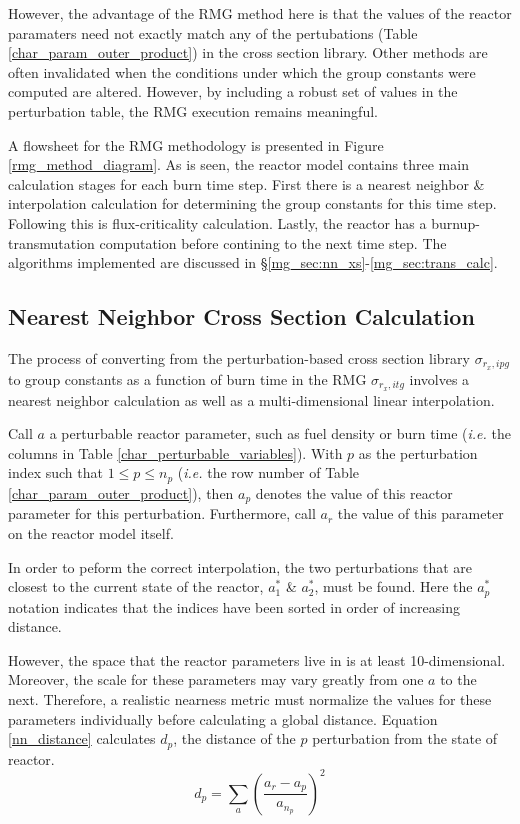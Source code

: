 However, the advantage of the RMG method here is that the values of the reactor paramaters
need not exactly match any of the pertubations (Table \ref{char_param_outer_product}) in the 
cross section library.  Other methods are often invalidated when the conditions under which 
the group constants were computed are altered.  However, by including a robust set of values
in the perturbation table, the RMG execution remains meaningful.



A flowsheet for the RMG methodology is presented in Figure \ref{rmg_method_diagram}.  As is
seen, the reactor model contains three main calculation stages for each burn time step.
First there is a nearest neighbor \& interpolation calculation for determining the group
constants for this time step.  Following this is flux-criticality calculation.  Lastly, the reactor
has a burnup-transmutation computation before contining to the next time step.  The algorithms
implemented are discussed in \S \ref{mg_sec:nn_xs}-\ref{mg_sec:trans_calc}.


\subsection{Nearest Neighbor Cross Section Calculation}
\label{mg_sec:nn_xs}
The process of converting from the perturbation-based cross section library $\sigma_{r_x,ipg}$ to 
group constants as a function of burn time in the RMG $\sigma_{r_x,itg}$ involves a nearest 
neighbor calculation as well as a multi-dimensional linear interpolation.

Call $a$ a perturbable reactor parameter, such as fuel density or burn time (\emph{i.e.} the 
columns in Table \ref{char_perturbable_variables}).   With $p$ as the perturbation index 
such that $1 \le p \le n_p$ (\emph{i.e.} the row number of Table \ref{char_param_outer_product}), 
then $a_p$ denotes the value of this reactor parameter for this perturbation.  Furthermore, call
$a_r$ the value of this parameter on the reactor model itself.

In order to peform the correct interpolation, the two perturbations that are closest to the current
state of the reactor, $a_1^*$ \& $a_2^*$, must be found.  Here the $a_p^*$ notation indicates that 
the indices have been sorted in order of increasing distance.  

However, the space that the reactor parameters live in is at least 10-dimensional.  Moreover, 
the scale for these parameters may vary greatly from one $a$ to the next.  Therefore, a realistic
nearness metric must normalize the values for these parameters individually before calculating a
global distance.  Equation \ref{nn_distance} calculates $d_p$, the distance of the $p$ 
perturbation from the state of reactor.
\begin{equation}
\label{nn_distance}
d_p = \sum_a \left(\frac{a_r - a_p}{a_{n_p}}\right)^2
\end{equation}


